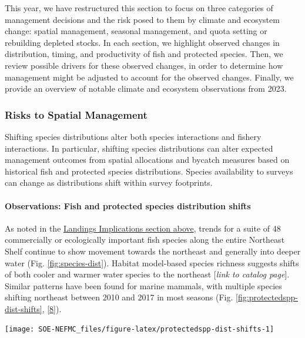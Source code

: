 \documentclass[
  10pt,
]{article}
\let\origfigure\figure
\let\endorigfigure\endfigure
\renewenvironment{figure}[1][2] {
    \expandafter\origfigure\expandafter[H]
} {
    \endorigfigure
}
\begin{document}
This year, we have restructured this section to focus on three categories of management decisions and the risk posed to them by climate and ecosystem change: spatial management, seasonal management, and quota setting or rebuilding depleted stocks. In each section, we highlight observed changes in distribution, timing, and productivity of fish and protected species. Then, we review possible drivers for these observed changes, in order to determine how management might be adjusted to account for the observed changes. Finally, we provide an overview of notable climate and ecosystem observations from 2023.

\hypertarget{risks-to-spatial-management}{%
\subsubsection{Risks to Spatial Management}\label{risks-to-spatial-management}}

Shifting species distributions alter both species interactions and fishery interactions. In particular, shifting species distributions can alter expected management outcomes from spatial allocations and bycatch measures based on historical fish and protected species distributions. Species availability to surveys can change as distributions shift within survey footprints.

\hypertarget{observations-fish-and-protected-species-distribution-shifts}{%
\paragraph{Observations: Fish and protected species distribution shifts}\label{observations-fish-and-protected-species-distribution-shifts}}

As noted in the \protect\hyperlink{implications}{Landings Implications section above}, trends for a suite of 48 commercially or ecologically important fish species along the entire Northeast Shelf continue to show movement towards the northeast and generally into deeper water (Fig. \ref{fig:species-dist}). Habitat model-based species richness suggests shifts of both cooler and warmer water species to the northeast {[}\emph{link to catalog page}{]}. Similar patterns have been found for marine mammals, with multiple species shifting northeast between 2010 and 2017 in most seasons (Fig. \ref{fig:protectedspp-dist-shifts}, {[}\protect\hyperlink{ref-chavez-rosales_detection_2022}{8}{]}).

\begin{figure}

{\centering \texttt{[image: SOE-NEFMC\_files/figure-latex/protectedspp-dist-shifts-1]} 

}

\caption{Direction and magnitude of core habitat shifts, represented by the length of the line of the seasonal weighted centroid for species with more than 70 km difference between 2010 and 2017 (tip of arrow).}\label{fig:protectedspp-dist-shifts}
\end{figure}
\end{document}
